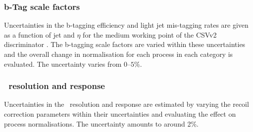 \subsubsection*{b-Tag scale factors}
Uncertainties in the b-tagging efficiency and light jet mis-tagging
rates are given as a function of jet \pT and $\eta$ for the 
medium working point of the \ac{CSV}v2 discriminator \cite{cms-btag-run2}.
The b-tagging scale factors are varied within these uncertainties
and the overall change in normalisation for each process in each category is
evaluated. The uncertainty varies from $0$--$5$\%.
\subsubsection*{\MET~resolution and response}
Uncertainties in the \MET~resolution and response are estimated
by varying the recoil correction parameters within their
uncertainties and evaluating the effect on process
normalisations. The uncertainty amounts to around 2\%.
